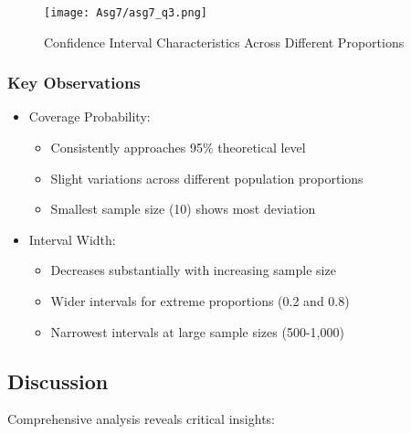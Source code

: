 \documentclass[12pt]{article}
\begin{document}
\begin{figure}
    \centering
    \texttt{[image: Asg7/asg7\_q3.png]}
    \caption{Confidence Interval Characteristics Across Different Proportions}
    \label{fig:enter-label}
\end{figure}

\subsubsection{Key Observations}
\begin{itemize}
    \item Coverage Probability:
    \begin{itemize}
        \item Consistently approaches 95\% theoretical level
        \item Slight variations across different population proportions
        \item Smallest sample size (10) shows most deviation
    \end{itemize}
    
    \item Interval Width:
    \begin{itemize}
        \item Decreases substantially with increasing sample size
        \item Wider intervals for extreme proportions (0.2 and 0.8)
        \item Narrowest intervals at large sample sizes (500-1,000)
    \end{itemize}
\end{itemize}

\subsection{Discussion}
Comprehensive analysis reveals critical insights:
\end{document}
